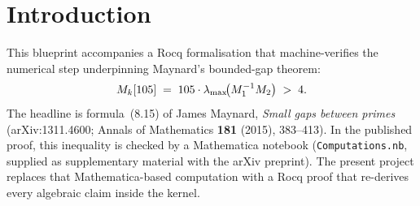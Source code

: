 %
%

\chapter*{Introduction}

This blueprint accompanies a Rocq formalisation that machine-verifies the
numerical step underpinning Maynard's bounded-gap theorem:
\[
   M_k[105] \;=\; 105 \cdot \lambda_{\max}\!\bigl(M_1^{-1}M_2\bigr) \;>\; 4.
\]
The headline is formula~(8.15) of James Maynard,
\emph{Small gaps between primes} (arXiv:1311.4600;
Annals of Mathematics \textbf{181} (2015), 383--413).
In the published proof, this inequality is checked by a Mathematica
notebook (\texttt{Computations.nb}, supplied as supplementary material
with the arXiv preprint). The present project replaces that
Mathematica-based computation with a Rocq proof that re-derives every
algebraic claim inside the kernel.

